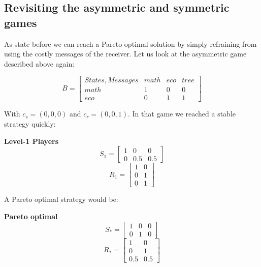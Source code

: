 \documentclass{article}
\begin{document}
\subsection{Revisiting the asymmetric and symmetric games}
As state before we can reach a Pareto optimal solution by simply refraining from using the costly messages of the receiver. Let us look at the asymmetric game described above again:

 \begin{equation*}
 B =
 \begin{bmatrix}

 States, Messages & math & eco & tree \\
 math             & 1    & 0   & 0    \\
 eco              & 0    & 1   & 1
 \end{bmatrix}
 \end{equation*}

 With $c_s=(0,0,0)$ and $c_r=(0,0,1)$. In that game we reached a stable strategy quickly:

\textbf{Level-1 Players}\\
\begin{equation*}
S_1=
\begin{bmatrix}
1 & 0 & 0\\
0 & 0.5 & 0.5
\end{bmatrix}
\end{equation*}
\begin{equation*}
R_1=
\begin{bmatrix}
1 & 0\\
0 & 1\\
0 & 1
\end{bmatrix}
\end{equation*}

A Pareto optimal strategy would be:

\textbf{Pareto optimal}\\
\begin{equation*}
S_*=
\begin{bmatrix}
1 & 0 & 0\\
0 & 1 & 0
\end{bmatrix}
\end{equation*}
\begin{equation*}
R_*=
\begin{bmatrix}
1 & 0\\
0 & 1\\
0.5 & 0.5
\end{bmatrix}
\end{equation*}
\end{document}
